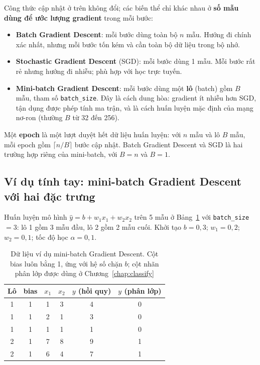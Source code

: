 Công thức cập nhật ở trên không đổi; các biến thể chỉ khác nhau ở \textbf{số mẫu dùng để ước lượng gradient} trong mỗi bước:
\begin{itemize}
    \item \textbf{Batch Gradient Descent}: mỗi bước dùng toàn bộ $n$ mẫu. Hướng đi chính xác nhất, nhưng mỗi bước tốn kém và cần toàn bộ dữ liệu trong bộ nhớ.
    \item \textbf{Stochastic Gradient Descent} (SGD): mỗi bước dùng 1 mẫu. Mỗi bước rất rẻ nhưng hướng đi nhiễu; phù hợp với học trực tuyến.
    \item \textbf{Mini-batch Gradient Descent}: mỗi bước dùng một \textbf{lô} (batch) gồm $B$ mẫu, tham số \texttt{batch\_size}. Đây là cách dung hòa: gradient ít nhiễu hơn SGD, tận dụng được phép tính ma trận, và là cách huấn luyện mặc định của mạng nơ-ron (thường $B$ từ 32 đến 256).
\end{itemize}
Một \textbf{epoch} là một lượt duyệt hết dữ liệu huấn luyện: với $n$ mẫu và lô $B$ mẫu, mỗi epoch gồm $\lceil n/B \rceil$ bước cập nhật. Batch Gradient Descent và SGD là hai trường hợp riêng của mini-batch, với $B = n$ và $B = 1$.

\subsection{Ví dụ tính tay: mini-batch Gradient Descent với hai đặc trưng}
\label{sec:minibatch-gd}

\begin{example}
Huấn luyện mô hình $\hat{y} = b + w_1 x_1 + w_2 x_2$ trên 5 mẫu ở Bảng~\ref{tab:minibatch-data} với \texttt{batch\_size} $= 3$: lô 1 gồm 3 mẫu đầu, lô 2 gồm 2 mẫu cuối. Khởi tạo $b = 0{,}3$; $w_1 = 0{,}2$; $w_2 = 0{,}1$; tốc độ học $\alpha = 0{,}1$.
\end{example}

\begin{table}[H]
\centering
\begin{tabular}{|c|c|c|c|c|c|}
\hline
\textbf{Lô} & \textbf{bias} & $x_1$ & $x_2$ & $y$ \textbf{(hồi quy)} & $y$ \textbf{(phân lớp)} \\
\hline
1 & 1 & 1 & 3 & 4 & 0 \\
1 & 1 & 2 & 1 & 3 & 0 \\
1 & 1 & 1 & 1 & 1 & 0 \\ \hline
2 & 1 & 7 & 8 & 9 & 1 \\
2 & 1 & 6 & 4 & 7 & 1 \\ \hline
\end{tabular}
\caption{Dữ liệu ví dụ mini-batch Gradient Descent. Cột bias luôn bằng 1, ứng với hệ số chặn $b$; cột nhãn phân lớp được dùng ở Chương~\ref{chap:classify}}
\label{tab:minibatch-data}
\end{table}

